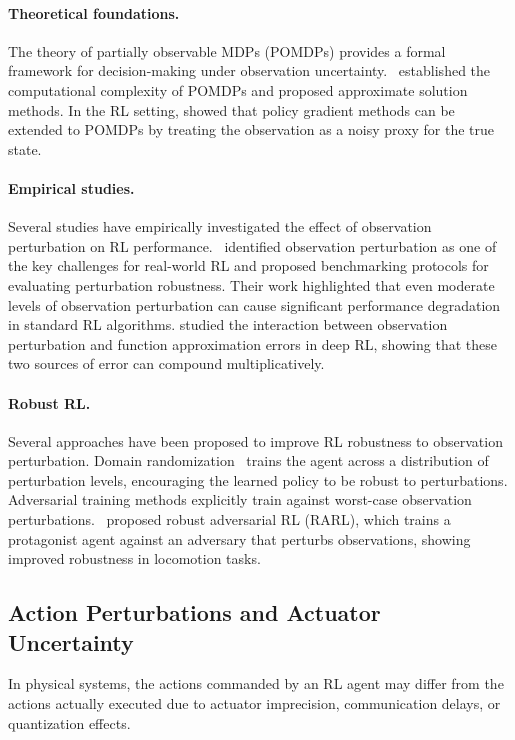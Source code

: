 \paragraph{Theoretical foundations.} The theory of partially observable MDPs (POMDPs) provides a formal framework for decision-making under observation uncertainty.~\citet{kaelbling1998pomdp} established the computational complexity of POMDPs and proposed approximate solution methods. In the RL setting, \citet{jaakkola1994reinforcement} showed that policy gradient methods can be extended to POMDPs by treating the observation as a noisy proxy for the true state.

\paragraph{Empirical studies.} Several studies have empirically investigated the effect of observation perturbation on RL performance.~\citet{dulacarnold2021challenges} identified observation perturbation as one of the key challenges for real-world RL and proposed benchmarking protocols for evaluating perturbation robustness. Their work highlighted that even moderate levels of observation perturbation can cause significant performance degradation in standard RL algorithms. \citet{fox2018dithering} studied the interaction between observation perturbation and function approximation errors in deep RL, showing that these two sources of error can compound multiplicatively.

\paragraph{Robust RL.} Several approaches have been proposed to improve RL robustness to observation perturbation. Domain randomization~\citep{tobin2017domain} trains the agent across a distribution of perturbation levels, encouraging the learned policy to be robust to perturbations. Adversarial training methods explicitly train against worst-case observation perturbations.~\citet{pinto2017rarl} proposed robust adversarial RL (RARL), which trains a protagonist agent against an adversary that perturbs observations, showing improved robustness in locomotion tasks.

\subsection{Action Perturbations and Actuator Uncertainty}

In physical systems, the actions commanded by an RL agent may differ from the actions actually executed due to actuator imprecision, communication delays, or quantization effects.

